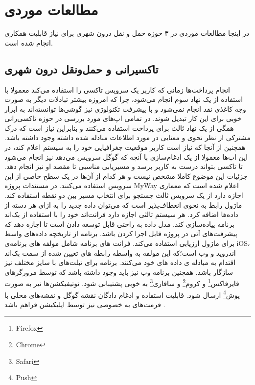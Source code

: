 \section{مطالعات موردی}
در اینجا مطالعات موردی در ۳ حوزه حمل و نقل درون شهری برای نیاز قابلیت همکاری انجام شده است. 


\subsection{تاکسیرانی و حمل‌و‌نقل درون شهری}

انجام پرداخت‌ها زمانی که کاربر یک سرویس تاکسی را استفاده می‌کند معمولا با استفاده از یک نهاد سوم انجام می‌شود، چرا که امروزه بیشتر تبادلات دیگر به صورت وجه کاغذی نقد انجام نمی‌شود و با پیشرفت تکنولوژی نیز گوشی‌ها توانسته‌اند به ابزار خوبی برای این کار تبدیل شوند. در تمامی اپ‌های مورد بررسی در حوزه تاکسی‌رانی همگی از یک نهاد ثالث برای پرداخت استفاده می‌کنند \cite{payment} و بنابراین نیاز است که درک مشترکی از نظر نحوی و معنایی در مورد اطلاعات مبادله شده داشته وجود داشته باشد.
همچنین از آنجا که نیاز است کاربر موقعیت جغرافیایی خود را به سیستم اعلام کند، در این اپ‌ها معمولا از یک ادغام‌سازی با آنچه که گوگل سرویس ‌می‌دهد نیز انجام می‌شود تا تاکسی بتواند درست به کاربر برسد و مسیریابی مناسبی تا مقصد او نیز انجام دهد. جزئیات این موضوع کاملا مشخص نیست و هر کدام از آن‌ها در یک سطح خاصی از این سرویس استفاده می‌کنند.
در مستندات پروژه MyWay اعلام شده است که معماری اجازه دارد از یک سرویس ثالث جستجو برای انتخاب مسیر بین دو نقطه استفاده کند. ماژول رابط به نحوی انعطاف‌پذیر است که می‌توان داده جدید را به ازای هر دسته از داده‌ها اضافه کرد. هر سیستم ثالثی اجازه دارد فرانت‌اند خود را با استفاده از بک‌اند برنامه پیاده‌سازی کند. مدل داده به راحتی قابل توسعه دادن است تا اجازه دهد که پیشرفت‌های آتی در پروژه قابل اجرا کردن باشد. برنامه از تاریخچه داده‌های واسط برای ماژول ارزیابی استفاده می‌کند. فرانت های برنامه شامل مولفه های برنامه‌ی iOS، اندروید و وب است؛که این مولفه به واسطه رابطه های تعیین شده از سمت بک‌اند اقتدام به مبادله ی داده های خود می‌کنند. برنامه برای تبلت‌های با سایز مختلف نیز سازگار باشد. همچنین برنامه وب نیز باید وجود داشته باشد که توسط مرورگرهای فایرفاکس\footnote{Firefox} و کروم\footnote{Chrome} و سافاری\footnote{Safari} به خوبی پشتیبانی شود.
نوتیفیکشن‌ها نیز به صورت پوش\footnote{Push} ارسال شود.
قابلیت استفاده و ادغام دادگان نقشه گوگل و نقشه‌های محلی با فرمت‌های به خصوصی نیز توسط اپلیکیشن فراهم باشد \cite{myway_req}.


